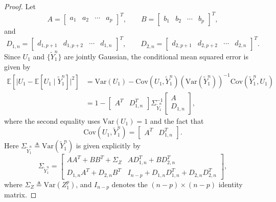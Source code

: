 \documentclass[12pt]{article}
\newcommand{\E}{\mathbb{E}}
\begin{document}
\begin{proof}
Let 
\[
A = \begin{bmatrix} a_1 & a_2 & \cdots & a_p \end{bmatrix}^T,\qquad
B = \begin{bmatrix} b_1 & b_2 & \cdots & b_p \end{bmatrix}^T,
\]
and
\[
D_{1,n} = \begin{bmatrix} d_{1,p+1} & d_{1,p+2} & \cdots & d_{1,n} \end{bmatrix}^T,\qquad
D_{2,n} = \begin{bmatrix} d_{2,p+1} & d_{2,p+2} & \cdots & d_{2,n} \end{bmatrix}^T.
\]
Since $U_1$ and $\{\widetilde{Y}_1^n\}$ are jointly Gaussian, the conditional mean squared error is given by 
\begin{equation}\label{MMSE-U-1-a}
\begin{aligned}
   \E[\vert U_1-\E[U_1\mid \widetilde{Y}_1^n] \vert^2] &= \mathrm{Var}(U_1) - \mathrm{Cov}(U_1,\widetilde{Y}_1^n)(\mathrm{Var}(\widetilde{Y}_1^n))^{-1}\mathrm{Cov}(\widetilde{Y}_1^n,U_1)\\
   &= 1 - \begin{bmatrix}A^T & D_{1,n}^T \end{bmatrix}\Sigma_{\widetilde{Y}_1^n}^{-1}\begin{bmatrix}A\\[2pt] D_{1,n}\end{bmatrix},
\end{aligned}
\end{equation}
where the second equality uses $\mathrm{Var}(U_1)=1$ and the fact that
\[
   \mathrm{Cov}(U_1,\widetilde{Y}_1^n)= \begin{bmatrix}A^T & D_{1,n}^T \end{bmatrix}.
\]
Here $\Sigma_{\widetilde{Y}_1^n} \triangleq\mathrm{Var}(\widetilde{Y}_1^n)$ is given explicitly by
\begin{equation}\label{def-Sigma-Y-tilta}
   \Sigma_{\widetilde{Y}_1^n} =\begin{bmatrix}
         AA^T+BB^T+\Sigma_Z & A D_{1,n}^T+BD_{2,n}^T\\[2pt]
         D_{1,n}A^T +D_{2,n} B^T & I_{n-p}+D_{1,n}D_{1,n}^T +D_{2,n}D_{2,n}^T
      \end{bmatrix},
\end{equation}
where $\Sigma_Z\triangleq\mathrm{Var}(Z_1^p)$, and $I_{n-p}$ denotes the $(n-p)\times(n-p)$ identity matrix. 


\end{proof}
\end{document}
